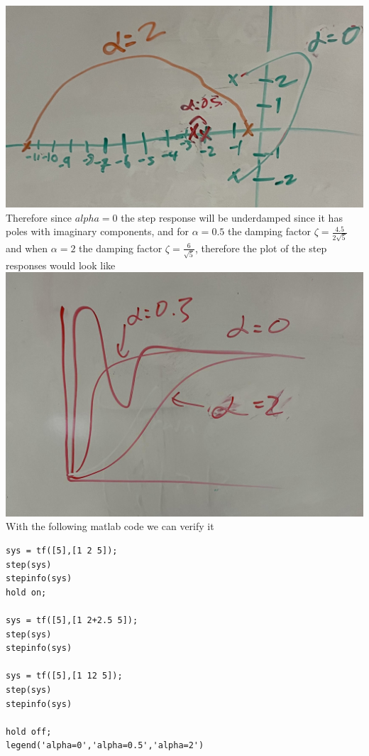 \documentclass[12pt]{article}
\begin{document}
\\\includegraphics[scale=0.15]{Problem1fig2.jpg}\\
Therefore since $alpha=0$ the step response will be underdamped since it has poles with imaginary components, and for $\alpha=0.5$ the damping factor $\zeta=\frac{4.5}{2\sqrt{5}}$ and when 
$\alpha=2$ the damping factor $\zeta=\frac{6}{\sqrt{5}}$, therefore the plot of the step responses would look like
\\\includegraphics[scale=0.15]{Problem1fig3.jpg}\\
With the following matlab code we can verify it
\begin{verbatim}
sys = tf([5],[1 2 5]);
step(sys)
stepinfo(sys)
hold on;

sys = tf([5],[1 2+2.5 5]);
step(sys)
stepinfo(sys)

sys = tf([5],[1 12 5]);
step(sys)
stepinfo(sys)

hold off;
legend('alpha=0','alpha=0.5','alpha=2')
\end{verbatim}
\end{document}
